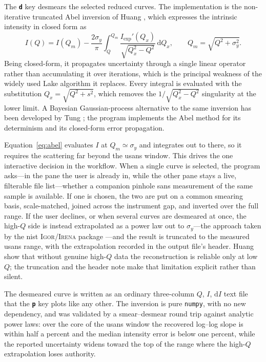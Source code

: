 \documentclass[tm]{ornltm}
\newcommand{\key}[1]{\textbf{\texttt{#1}}}
\begin{document}
The \key{d} key desmears the selected reduced curves. The implementation is the
non-iterative truncated Abel inversion of Huang \autocite{huang2026abel}, which
expresses the intrinsic intensity in closed form as
%
\begin{equation}
  I(Q) = I(Q_m) - \frac{2\sigma_y}{\pi}
    \int_Q^{Q_m}\frac{I_\text{exp}'(Q_x)}{\sqrt{Q_x^2 - Q^2}}\,\mathrm{d}Q_x,
  \qquad Q_m = \sqrt{Q^2 + \sigma_y^2}.
  \label{eq:abel}
\end{equation}
%
Being closed-form, it propagates uncertainty through a single linear operator
rather than accumulating it over iterations, which is the principal weakness of
the widely used Lake algorithm \autocite{lake1967} it replaces. Every integral
is evaluated with the substitution $Q_x = \sqrt{Q^2 + s^2}$, which removes the
$1/\sqrt{Q_x^2 - Q^2}$ singularity at the lower limit. A Bayesian Gaussian-process
alternative to the same inversion has been developed by Tung
\autocite{tung2026gpr}; the program implements the Abel method for its
determinism and its closed-form error propagation.

Equation~\eqref{eq:abel} evaluates $I$ at $Q_m \simeq \sigma_y$ and integrates
out to there, so it requires the scattering far beyond the \ac{usans} window.
This drives the one interactive decision in the workflow. When a single curve is
selected, the program asks---in the pane the user is already in, while the other
pane stays a live, filterable file list---whether a companion pinhole \ac{sans}
measurement of the same sample is available. If one is chosen, the two are put on
a common smearing basis, scale-matched, joined across the instrument gap, and
inverted over the full range. If the user declines, or when several curves are
desmeared at once, the high-$Q$ side is instead extrapolated as a power law out
to $\sigma_y$---the approach taken by the \ac{nist} \textsc{Igor}/\textsc{Irena}
package \autocite{kline2006}---and the result is truncated to the measured
\ac{usans} range, with the extrapolation recorded in the output file's header.
Huang \autocite{huang2026abel} show that without genuine high-$Q$ data the
reconstruction is reliable only at low $Q$; the truncation and the header note
make that limitation explicit rather than silent.

The desmeared curve is written as an ordinary three-column
$Q$, $I$, $\mathrm{d}I$ text file that the \key{p} key plots like any other. The
inversion is pure \texttt{numpy}, with no new dependency, and was validated by a
smear--desmear round trip against analytic power laws: over the core of the
\ac{usans} window the recovered log--log slope is within half a percent and the
median intensity error is below one percent, while the reported uncertainty
widens toward the top of the range where the high-$Q$ extrapolation loses
authority.
\end{document}
